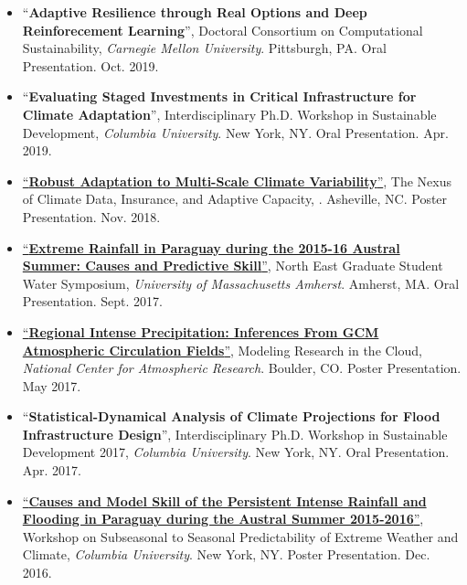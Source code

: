 \documentclass[11pt,article,oneside]{memoir}
\begin{document}
\begin{itemize}[label={}]

  \item \enquote{\textbf{Adaptive Resilience through Real Options and Deep Reinforecement Learning}}, Doctoral Consortium on Computational Sustainability,  \textit{Carnegie Mellon University}. Pittsburgh,  PA. Oral Presentation. Oct. 2019.

  \item \enquote{\textbf{Evaluating Staged Investments in Critical Infrastructure for Climate Adaptation}}, Interdisciplinary Ph.D. Workshop in Sustainable Development,  \textit{Columbia University}. New York, NY. Oral Presentation. Apr. 2019.

  \item \href{https://doi.org/10.6084/m9.figshare.8277002.v1}{\enquote{\textbf{Robust Adaptation to Multi-Scale Climate Variability}}}, The Nexus of Climate Data, Insurance, and Adaptive Capacity,  \textit{}. Asheville, NC. Poster Presentation. Nov. 2018.

  \item \href{https://doi.org/10.6084/m9.figshare.8277128.v2}{\enquote{\textbf{Extreme Rainfall in Paraguay during the 2015-16 Austral Summer: Causes and Predictive Skill}}}, North East Graduate Student Water Symposium,  \textit{University of Massachusetts Amherst}. Amherst, MA. Oral Presentation. Sept. 2017.

  \item \href{https://doi.org/10.6084/m9.figshare.8277167.v1}{\enquote{\textbf{Regional Intense Precipitation: Inferences From GCM Atmospheric Circulation Fields}}}, Modeling Research in the Cloud,  \textit{National Center for Atmospheric Research}. Boulder, CO. Poster Presentation. May 2017.

  \item \enquote{\textbf{Statistical-Dynamical Analysis of Climate Projections for Flood Infrastructure Design}}, Interdisciplinary Ph.D. Workshop in Sustainable Development 2017,  \textit{Columbia University}. New York, NY. Oral Presentation. Apr. 2017.

  \item \href{10.13140/RG.2.2.20146.30406}{\enquote{\textbf{Causes and Model Skill of the Persistent Intense Rainfall and Flooding in Paraguay during the Austral Summer 2015-2016}}}, Workshop on Subseasonal to Seasonal Predictability of Extreme Weather and Climate,  \textit{Columbia University}. New York, NY. Poster Presentation. Dec. 2016.

\end{itemize}
\end{document}
